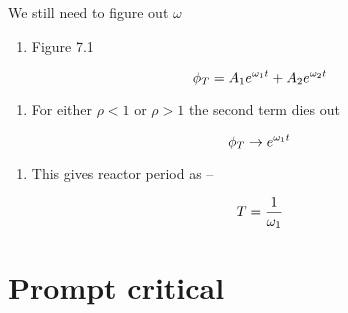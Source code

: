 \documentclass[aspectratio=1610,pdftex,dvipsnames,compress,xcolor={dvipsnames}]{beamer}
\begin{document}
\addtocounter{framenumber}{-1} 
\begin{frame}{We still need to figure out $\omega$}
    \begin{enumerate}[series=outerlist,topsep=0pt,itemsep=21pt,leftmargin=*,label=(\arabic*)]
        \item[]Figure 7.1
    \end{enumerate}

    \vspace*{\fill}

    \begin{equation}
        \LARGE
        \phi_T = A_1 e^{\omega_1 t} + A_2 e^{\omega_2 t}
    \end{equation}

    \vspace*{\fill}

    \begin{enumerate}[series=outerlist,topsep=0pt,itemsep=21pt,leftmargin=*,label=(\arabic*)]
        \item[]For either $\rho < 1$ or $\rho > 1$ the second term dies out
    \end{enumerate}

    \vspace*{\fill}

    \begin{equation}
        \LARGE
        \phi_T \rightarrow e^{\omega_1 t}
    \end{equation}

    \vspace*{\fill}

    \begin{enumerate}[series=outerlist,topsep=0pt,itemsep=21pt,leftmargin=*,label=(\arabic*)]
        \item[]This gives reactor period as --
    \end{enumerate}

    \vspace*{\fill}

    \begin{equation}
        \LARGE
        T = \frac{1}{\omega_1}
    \end{equation}
\end{frame}


\section{Prompt critical}
\end{document}
